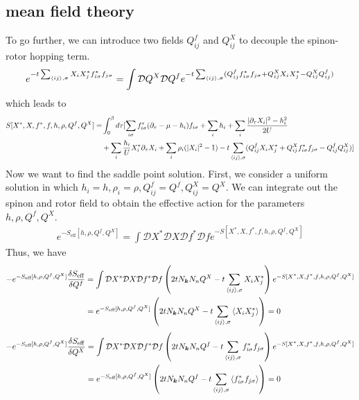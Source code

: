 \documentclass{article}
\begin{document}
\subsection{mean field theory}
To go further, we can introduce two fields $Q_{ij}^f$ and $Q_{ij}^X$ to decouple the spinon-rotor hopping term.
\begin{align*}
    e^{-t\sum_{\braket{ij},\sigma}X_iX_j^*f_{i\sigma}^*f_{j\sigma}} = \int\mathcal{D}Q^X\mathcal{D}Q^fe^{-t\sum_{\braket{ij},\sigma}(Q_{ij}^ff_{i\sigma}^*f_{j\sigma}+Q_{ij}^XX_{i}X_{j}^*-Q_{ij}^XQ_{ij}^f)}
\end{align*}
which leads to 
\begin{align*}
    S[X^*,X,f^*,f,h,\rho,Q^f,Q^X] = &\int_0^{\beta} d\tau [\sum_{i\sigma}f_{i\sigma}^*(\partial_{\tau}-\mu-h_i)f_{i\sigma}+\sum_ih_i+\sum_i\frac{|\partial_{\tau}X_i|^2-h_i^2}{2U}\\ 
    &+\sum_i\frac{h_i}{U}X_i^*\partial_{\tau}X_i+\sum_i\rho_i(|X_i|^2-1)-t\sum_{\braket{ij},\sigma}(Q_{ij}^fX_iX_j^*+Q_{ij}^Xf_{i\sigma}^*f_{j\sigma}-Q_{ij}^fQ_{ij}^X)]
\end{align*}
Now we want to find the saddle point solution. First, we consider a uniform solution in which $h_i = h,\rho_i = \rho,Q_{ij}^f = Q^f,Q_{ij}^X = Q^X$. We can integrate out the spinon and rotor field to obtain the effective action for the 
parameters $h,\rho,Q^f,Q^X$.
\begin{align*}
e^{-S_{\text{eff}}[h,\rho,Q^f,Q^X]} = \int \mathcal{D}X^*\mathcal{D}X\mathcal{D}f^*\mathcal{D}fe^{-S[X^*,X,f^*,f,h,\rho,Q^f,Q^X]}
\end{align*}
Thus, we have
\begin{align*}
    -e^{-S_{\text{eff}}[h,\rho,Q^f,Q^X]}\frac{\delta S_{\text{eff}}}{\delta Q^f} &= \int \mathcal{D}X^*\mathcal{D}X\mathcal{D}f^*\mathcal{D}f\left(2tN_{\bm{k}}N_nQ^X-t\sum_{\braket{ij},\sigma}X_iX_j^*\right)e^{-S[X^*,X,f^*,f,h,\rho,Q^f,Q^X]}\\
    & = e^{-S_{\text{eff}}[h,\rho,Q^f,Q^X]}\left(2tN_{\bm{k}}N_nQ^X-t\sum_{\braket{ij},\sigma}\braket{X_iX_j^*}\right) =0
\end{align*}
\begin{align*}
-e^{-S_{\text{eff}}[h,\rho,Q^f,Q^X]}\frac{\delta S_{\text{eff}}}{\delta Q^X} &= \int \mathcal{D}X^*\mathcal{D}X\mathcal{D}f^*\mathcal{D}f\left(2tN_{\bm{k}}N_nQ^f-t\sum_{\braket{ij},\sigma}f_{i\sigma}^*f_{j\sigma}\right)e^{-S[X^*,X,f^*,f,h,\rho,Q^f,Q^X]}\\
    & = e^{-S_{\text{eff}}[h,\rho,Q^f,Q^X]}\left(2tN_{\bm{k}}N_nQ^f-t\sum_{\braket{ij},\sigma}\braket{f_{i\sigma}^*f_{j\sigma}}\right) =0
\end{align*}
\end{document}
